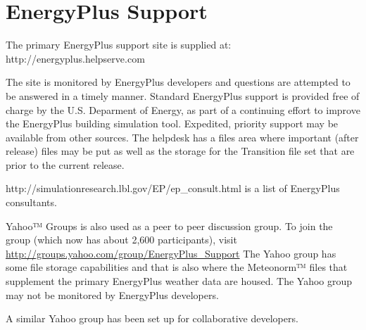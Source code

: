 \section{EnergyPlus Support}\label{energyplus-support}

The primary EnergyPlus support site is supplied at: http://energyplus.helpserve.com

The site is monitored by EnergyPlus developers and questions are attempted to be answered in a timely manner. Standard EnergyPlus support is provided free of charge by the U.S. Deparment of Energy, as part of a continuing effort to improve the EnergyPlus building simulation tool. Expedited, priority support may be available from other sources. The helpdesk has a files area where important (after release) files may be put as well as the storage for the Transition file set that are prior to the current release.

http://simulationresearch.lbl.gov/EP/ep\_consult.html is a list of EnergyPlus consultants.

Yahoo™ Groups is also used as a peer to peer discussion group. To join the group (which now has about 2,600 participants), visit \href{http://groups.yahoo.com/EnergyPlus_Support}{http://groups.yahoo.com/group/EnergyPlus\_Support} The Yahoo group has some file storage capabilities and that is also where the Meteonorm™ files that supplement the primary EnergyPlus weather data are housed. The Yahoo group may not be monitored by EnergyPlus developers.

A similar Yahoo group has been set up for collaborative developers.
